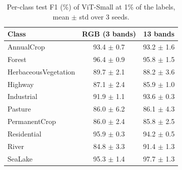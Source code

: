 \begin{table}[t]
\centering
\caption{Per-class test F1 (\%) of ViT-Small at 1\% of the labels, mean $\pm$ std over 3 seeds.}
\label{tab:per_class_f1_1pct}
\small
\begin{tabular}{lcc}
\toprule
Class & RGB (3 bands) & 13 bands \\
\midrule
AnnualCrop & 93.4 $\pm$ 0.7 & 93.2 $\pm$ 1.6 \\
Forest & 96.4 $\pm$ 0.9 & 95.8 $\pm$ 1.5 \\
HerbaceousVegetation & 89.7 $\pm$ 2.1 & 88.2 $\pm$ 3.6 \\
Highway & 87.1 $\pm$ 2.4 & 85.9 $\pm$ 1.0 \\
Industrial & 91.9 $\pm$ 1.1 & 93.6 $\pm$ 0.3 \\
Pasture & 86.0 $\pm$ 6.2 & 86.1 $\pm$ 4.3 \\
PermanentCrop & 86.0 $\pm$ 2.4 & 85.8 $\pm$ 2.5 \\
Residential & 95.9 $\pm$ 0.3 & 94.2 $\pm$ 0.5 \\
River & 84.8 $\pm$ 3.3 & 91.4 $\pm$ 1.3 \\
SeaLake & 95.3 $\pm$ 1.4 & 97.7 $\pm$ 1.3 \\
\bottomrule
\end{tabular}
\end{table}
